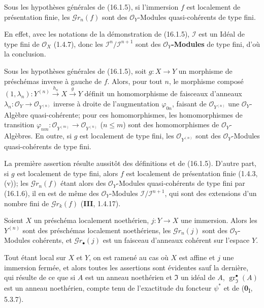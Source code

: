\begin{corollary}[16.1.6]
\label{IV.16.1.6}
Sous les hypothèses générales de \textup{(16.1.5)}, si l'immersion $f$ est localement de
présentation finie, les $\mathscr{G}r_n(f)$ sont des $\mathcal{O}_Y$-Modules
quasi-cohérents de type fini.
\end{corollary}

En effet, avec les notations de la démonstration de (16.1.5), $\mathscr{I}$ est un
Idéal de type fini de $\mathcal{O}_X$ (1.4.7), donc les
$\mathscr{I}^n/\mathscr{I}^{n+1}$ sont des $\mathcal{O}_Y$\textbf{-Modules} de type fini,
d'où la conclusion.

\begin{corollary}[16.1.7]
\label{IV.16.1.7}
Sous les hypothèses générales de \textup{(16.1.5)}, soit $g:X\to Y$ un morphisme de
préschémas inverse à gauche de $f$. Alors, pour tout $n$, le morphisme composé
$(1,\lambda_n):Y^{(n)}\xrightarrow{h_n}X\xrightarrow{g}Y$ définit un
homomorphisme de faisceaux d'anneaux
$\lambda_n:\mathcal{O}_Y\to\mathcal{O}_{Y^{(n)}}$ inverse à droite de
l'augmentation $\varphi_{0n}$, faisant de $\mathcal{O}_{Y^{(n)}}$ une
$\mathcal{O}_Y$-Algèbre quasi-cohérente; pour ces homomorphismes, les
homomorphismes de transition
$\varphi_{nm}:\mathcal{O}_{Y^{(m)}}\to\mathcal{O}_{Y^{(n)}}$ \textup{($n\leq m$)} sont
des homomorphismes de $\mathcal{O}_Y$-Algèbres. En outre, si $g$ est localement
de type fini, les $\mathcal{O}_{Y^{(n)}}$ sont des $\mathcal{O}_Y$-Modules
quasi-cohérents de type fini.
\end{corollary}

La première assertion résulte aussitôt des définitions et de (16.1.5). D'autre
part, si $g$ est localement de type fini, alors $f$ est localement de
présentation finie (1.4.3, (v)); les $\mathscr{G}r_n(f)$ étant alors des
$\mathcal{O}_Y$-Modules quasi-cohérents de type fini par (16.1.6), il en est de
même des $\mathcal{O}_Y$-Modules
$\mathscr{I}/\mathscr{I}^{n+1}$, qui sont des extensions d'un nombre fini de
$\mathscr{G}r_k(f)$ (\textbf{III}, 1.4.17).

\begin{proposition}[16.1.8]
\label{IV.16.1.8}
Soient $X$ un préschéma localement noethérien, $j:Y\to X$ une immersion. Alors
les $Y^{(n)}$ sont des préschémas localement noethériens, les
$\mathscr{G}r_n(j)$ sont des $\mathcal{O}_Y$-Modules cohérents, et
$\mathscr{G}r_\bullet(j)$ est un faisceau d'anneaux cohérent sur l'espace $Y$.
\end{proposition}

Tout étant local sur $X$ et $Y$, on est ramené au cas où $X$ est affine et $j$
une immersion fermée, et alors toutes les assertions sont évidentes sauf la
dernière, qui résulte de ce que si $A$ est un anneau noethérien et
$\mathfrak{I}$ un idéal de $A$, $\operatorname{gr}_{\mathfrak{I}}^\bullet(A)$
est un anneau noethérien, compte tenu de l'exactitude du foncteur $\psi^*$ et de
(\textbf{0}\textsubscript{I}, 5.3.7).

